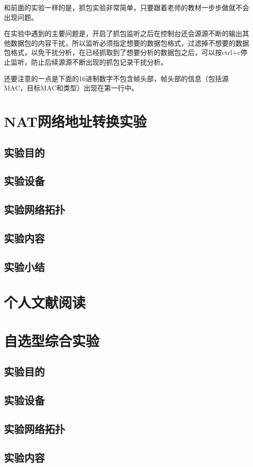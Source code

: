 \documentclass[lang=cn,11pt,a4paper,cite=authoryear]{elegantpaper}
\begin{document}
和前面的实验一样的是，抓包实验非常简单，只要跟着老师的教材一步步做就不会出现问题。

在实验中遇到的主要问题是，开启了抓包监听之后在控制台还会源源不断的输出其他数据包的内容干扰，所以监听必须指定想要的数据包格式，过滤掉不想要的数据包格式，以免干扰分析，在已经抓取到了想要分析的数据包之后，可以按ctrl+c停止监听，防止后续源源不断出现的抓包记录干扰分析。

还要注意的一点是下面的16进制数字不包含帧头部，帧头部的信息（包括源MAC，目标MAC和类型）出现在第一行中。

\section{NAT网络地址转换实验}
\subsection{实验目的}
\subsection{实验设备}
\subsection{实验网络拓扑}
\subsection{实验内容}
\subsection{实验小结}
\section{个人文献阅读}
\section{自选型综合实验}
\subsection{实验目的}
\subsection{实验设备}
\subsection{实验网络拓扑}
\subsection{实验内容}
\end{document}

